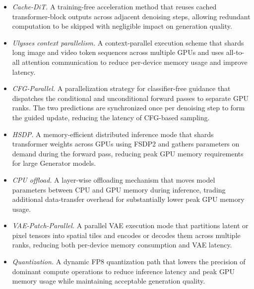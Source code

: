 \documentclass{llmxive}
\begin{document}
\begin{itemize}

    \item \textit{Cache-DiT.} A training-free acceleration method that reuses cached transformer-block outputs across adjacent denoising steps, allowing redundant computation to be skipped with negligible impact on generation quality.

    \item \textit{Ulysses context parallelism.} A context-parallel execution scheme that shards long image and video token sequences across multiple GPUs and uses all-to-all attention communication to reduce per-device memory usage and improve latency.

    \item \textit{CFG-Parallel.} A parallelization strategy for classifier-free guidance that dispatches the conditional and unconditional forward passes to separate GPU ranks. The two predictions are synchronized once per denoising step to form the guided update, reducing the latency of CFG-based sampling.

    \item \textit{HSDP.} A memory-efficient distributed inference mode that shards transformer weights across GPUs using FSDP2 and gathers parameters on demand during the forward pass, reducing peak GPU memory requirements for large Generator models.

    \item \textit{CPU offload.} A layer-wise offloading mechanism that moves model parameters between CPU and GPU memory during inference, trading additional data-transfer overhead for substantially lower peak GPU memory usage.

    \item \textit{VAE-Patch-Parallel.} A parallel VAE execution mode that partitions latent or pixel tensors into spatial tiles and encodes or decodes them across multiple ranks, reducing both per-device memory consumption and VAE latency.

    \item \textit{Quantization.} A dynamic FP8 quantization path that lowers the precision of dominant compute operations to reduce inference latency and peak GPU memory usage while maintaining acceptable generation quality.


\end{itemize}
\end{document}
